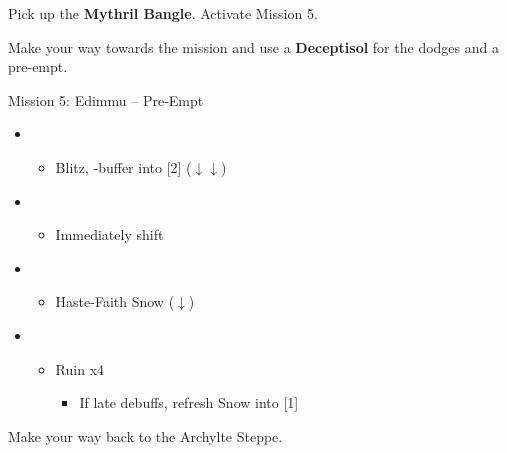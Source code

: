 Pick up the \textbf{Mythril Bangle}.
Activate Mission 5.

Make your way towards the mission and use a \textbf{Deceptisol} for the dodges and a pre-empt.

\begin{battle}{Mission 5: Edimmu -- Pre-Empt}
	\begin{itemize}
		\item \sixth
			\begin{itemize}
				\item Blitz, \rav-buffer into [2] ($\downarrow\downarrow$)
			\end{itemize}
		\item \second
			\begin{itemize}
				\item Immediately shift
			\end{itemize}
		\item \fourth
			\begin{itemize}
				\item Haste-Faith Snow ($\downarrow$)
			\end{itemize}
		\item \fifth
			\begin{itemize}
				\item Ruin x4
					\begin{itemize}
						\item If late debuffs, refresh Snow into [1]
					\end{itemize}
			\end{itemize}
	\end{itemize}
\end{battle}

Make your way back to the Archylte Steppe.